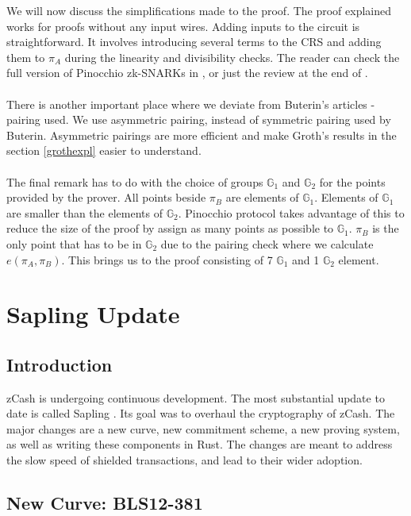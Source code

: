 We will now discuss the simplifications made to the proof. The proof explained works for proofs without any input wires. Adding inputs to the circuit is straightforward. It involves introducing several terms to the CRS and adding them to $\pi_A$ during the linearity and divisibility checks. The reader can check the full version of Pinocchio zk-SNARKs in \cite{parno2013pinocchio}, or just the review at the end of \cite{ben2014succinct}.\\
\\
There is another important place where we deviate from Buterin's articles - pairing used. We use asymmetric pairing, instead of symmetric pairing used by Buterin. Asymmetric pairings are more efficient and make Groth's results in the section \ref{grothexpl} easier to understand.\\
\\
The final remark has to do with the choice of groups $\mathbb{G}_1$ and $\mathbb{G}_2$ for the points provided by the prover. All points beside $\pi_B$ are elements of $\mathbb{G}_1$. Elements of $\mathbb{G}_1$ are smaller than the elements of $\mathbb{G}_2$. Pinocchio protocol takes advantage of this to reduce the size of the proof by assign as many points as possible to $\mathbb{G}_1$. $\pi_B$ is the only point that has to be in $\mathbb{G}_2$ due to the pairing check where we calculate $e(\pi_A, \pi_B)$. This brings us to the proof consisting of 7 $\mathbb{G}_1$ and 1 $\mathbb{G}_2$ element.

\section{Sapling Update}

\subsection{Introduction}
zCash is undergoing continuous development. The most substantial update to date is called Sapling \cite{zcashsapling}. Its goal was to overhaul the cryptography of zCash. The major changes are a new curve, new commitment scheme, a new proving system, as well as writing these components in Rust. The changes are meant to address the slow speed of shielded transactions, and lead to their wider adoption.

\subsection{New Curve: BLS12-381}

